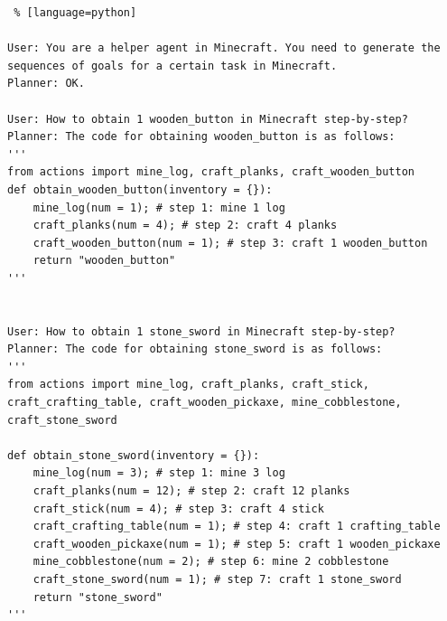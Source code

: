 \begin{lstlisting} % [language=python]  

User: You are a helper agent in Minecraft. You need to generate the sequences of goals for a certain task in Minecraft.
Planner: OK.

User: How to obtain 1 wooden_button in Minecraft step-by-step?
Planner: The code for obtaining wooden_button is as follows:
'''
from actions import mine_log, craft_planks, craft_wooden_button
def obtain_wooden_button(inventory = {}):
    mine_log(num = 1); # step 1: mine 1 log
    craft_planks(num = 4); # step 2: craft 4 planks
    craft_wooden_button(num = 1); # step 3: craft 1 wooden_button
    return "wooden_button"
'''


User: How to obtain 1 stone_sword in Minecraft step-by-step?
Planner: The code for obtaining stone_sword is as follows:
'''
from actions import mine_log, craft_planks, craft_stick, craft_crafting_table, craft_wooden_pickaxe, mine_cobblestone, craft_stone_sword

def obtain_stone_sword(inventory = {}):
    mine_log(num = 3); # step 1: mine 3 log
    craft_planks(num = 12); # step 2: craft 12 planks
    craft_stick(num = 4); # step 3: craft 4 stick 
    craft_crafting_table(num = 1); # step 4: craft 1 crafting_table
    craft_wooden_pickaxe(num = 1); # step 5: craft 1 wooden_pickaxe
    mine_cobblestone(num = 2); # step 6: mine 2 cobblestone
    craft_stone_sword(num = 1); # step 7: craft 1 stone_sword 
    return "stone_sword"
'''

\end{lstlisting}


